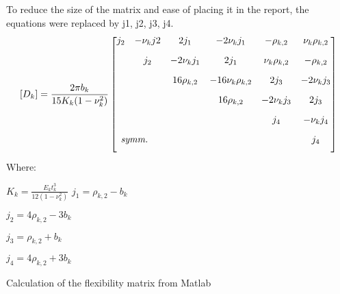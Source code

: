 To reduce the size of the matrix and ease of placing it in the report, the equations were replaced
by j1, j2, j3, j4.
\begin{equation}\label{eqn:flexMatrix}
  [D_k]=\frac{2\pi b_k}{15K_k(1-\nu_k^2)}
  \begin{bmatrix}
        j_2 & -\nu_kj2 & 2j_1 & -2\nu_kj_1 & -\rho_{k,2} & \nu_k\rho_{k,2} \\[2ex]
            & j_2 & -2\nu_kj_1 & 2j_1 & \nu_k\rho_{k,2} & -\rho_{k,2} \\[2ex]
            &  & 16\rho_{k,2} & -16\nu_k\rho_{k,2} & 2j_3 & -2\nu_kj_3 \\[2ex]
            &  &  & 16\rho_{k,2} & -2\nu_kj_3 & 2j_3 \\[2ex]
            &  &  &  & j_4 & -\nu_kj_4 \\[2ex]
      \rlap{\textit{symm.}} &  &  &  &  & j_4 \\[2ex]
    \end{bmatrix}
\end{equation}
Where:\par
$K_k=\frac{E_kt_k^3}{12(1-\nu_k^2)}$
$j_1=\rho_{k,2}-b_k$\par
$j_2=4\rho_{k,2}-3b_k$\par
$j_3=\rho_{k,2}+b_k$\par
$j_4=4\rho_{k,2}+3b_k$\par
\smallskip
Calculation of the flexibility matrix from Matlab\par
{}
